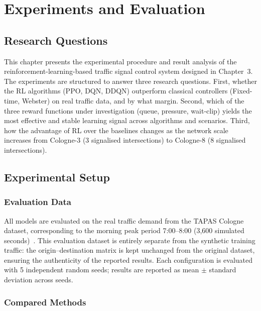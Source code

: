 \renewcommand{\tablename}{Table}
\renewcommand{\figurename}{Figure}

\chapter{Experiments and Evaluation}
\label{chap:experiment}

\section{Research Questions}

This chapter presents the experimental procedure and result analysis of the
reinforcement-learning-based traffic signal control system designed in
Chapter~3. The experiments are structured to answer three research questions.
First, whether the RL algorithms (PPO, DQN, DDQN) outperform classical
controllers (Fixed-time, Webster) on real traffic data, and by what margin.
Second, which of the three reward functions under investigation (queue,
pressure, wait-clip) yields the most effective and stable learning signal across
algorithms and scenarios. Third, how the advantage of RL over the baselines
changes as the network scale increases from Cologne-3 (3 signalised
intersections) to Cologne-8 (8 signalised intersections).

\section{Experimental Setup}

\subsection{Evaluation Data}

All models are evaluated on the real traffic demand from the TAPAS Cologne
dataset, corresponding to the morning peak period 7:00--8:00 (3{,}600
simulated seconds)~\cite{tapascologne}. This evaluation dataset is entirely
separate from the synthetic training traffic: the origin--destination matrix
is kept unchanged from the original dataset, ensuring the authenticity of the
reported results. Each configuration is evaluated with 5 independent random
seeds; results are reported as mean $\pm$ standard deviation across seeds.

\subsection{Compared Methods}

